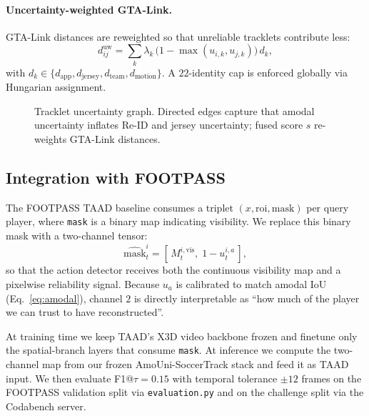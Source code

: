 \documentclass[conference]{IEEEtran}
\begin{document}
\paragraph*{Uncertainty-weighted GTA-Link.}
GTA-Link distances are reweighted so that unreliable tracklets contribute less:
\begin{equation}
d_{ij}^{\text{uw}} = \sum_k \lambda_k \,\big(1 - \max(u_{i,k}, u_{j,k})\big)\, d_k,
\label{eq:uw-dist}
\end{equation}
with $d_k\in\{d_{\text{app}}, d_{\text{jersey}}, d_{\text{team}}, d_{\text{motion}}\}$. A $22$-identity cap is enforced globally via Hungarian assignment.

\begin{figure}[t]
  \centering
  \caption{Tracklet uncertainty graph. Directed edges capture that amodal uncertainty inflates Re-ID and jersey uncertainty; fused score $s$ re-weights GTA-Link distances.}
  \label{fig:unc}
\end{figure}

\subsection{Integration with FOOTPASS}
\label{sec:footpass}

The FOOTPASS TAAD baseline \cite{footpass} consumes a triplet $(x, \text{roi}, \text{mask})$ per query player, where \texttt{mask} is a binary map indicating visibility. We replace this binary mask with a two-channel tensor:
\begin{equation}
\widehat{\text{mask}}_t^i = [\,M_t^{i,\text{vis}},\; 1 - u_t^{i,a}\,],
\label{eq:footpass-mask}
\end{equation}
so that the action detector receives both the continuous visibility map and a pixelwise reliability signal. Because $u_a$ is calibrated to match amodal IoU (Eq.~\ref{eq:amodal}), channel $2$ is directly interpretable as ``how much of the player we can trust to have reconstructed''.

At training time we keep TAAD's X3D \cite{x3d} video backbone frozen and finetune only the spatial-branch layers that consume \texttt{mask}. At inference we compute the two-channel map from our frozen AmoUni-SoccerTrack stack and feed it as TAAD input. We then evaluate F1@$\tau=0.15$ with temporal tolerance $\pm 12$ frames on the FOOTPASS validation split via \texttt{evaluation.py} and on the challenge split via the Codabench server.
\end{document}
